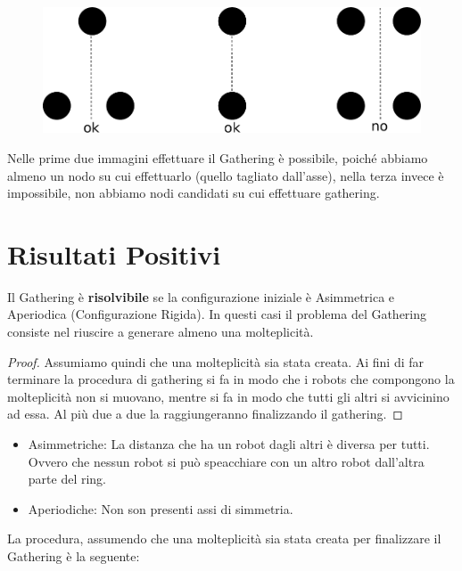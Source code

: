\begin{figure}[H]
    \centering
    \includegraphics[scale=0.7]{capitoli/gathering/imgs/n_48}
\end{figure}

Nelle prime due immagini effettuare il Gathering è possibile, poiché abbiamo
almeno un nodo su cui effettuarlo (quello tagliato dall'asse), nella terza
invece è impossibile, non abbiamo nodi candidati su cui effettuare gathering.

\section{Risultati Positivi}
\begin{theorem}
    Il Gathering è \textbf{risolvibile} se la configurazione iniziale è
    Asimmetrica e Aperiodica (Configurazione Rigida). In questi casi il problema del
    Gathering consiste nel riuscire a generare almeno una molteplicità.
\end{theorem}

\begin{proof}
    Assumiamo quindi che una molteplicità sia stata creata. Ai fini di far
    terminare la procedura di gathering si fa in modo che i robots che compongono
    la molteplicità non si muovano, mentre si fa in modo che tutti gli altri si
    avvicinino ad essa. Al più due a due la raggiungeranno finalizzando il
    gathering.
\end{proof}

\begin{itemize}
    \item Asimmetriche: La distanza che ha un robot dagli altri è diversa per
          tutti. Ovvero che nessun robot si può speacchiare con un altro robot
          dall'altra parte del ring.
    \item Aperiodiche: Non son presenti assi di simmetria.
\end{itemize}

La procedura, assumendo che una molteplicità sia stata creata per finalizzare il
Gathering è la seguente:

